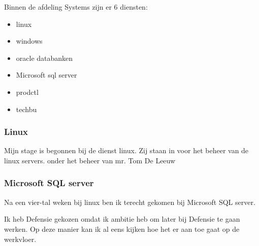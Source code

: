 Binnen de afdeling Systems zijn er 6 diensten:

\begin{itemize}
    \item linux
    \item windows
    \item oracle databanken
    \item Microsoft sql server
    \item prodctl
    \item techbu
\end{itemize}

\subsubsection{Linux}

Mijn stage is begonnen bij de dienst linux. Zij staan in voor het beheer van de linux servers. onder het beheer van mr. Tom De Leeuw

\subsubsection{Microsoft SQL server}

Na een vier-tal weken bij linux ben ik terecht gekomen bij Microsoft SQL server. 

Ik heb Defensie gekozen omdat ik ambitie heb om later bij Defensie te gaan werken. Op deze manier kan ik al eens kijken hoe het er aan toe gaat op de werkvloer.
